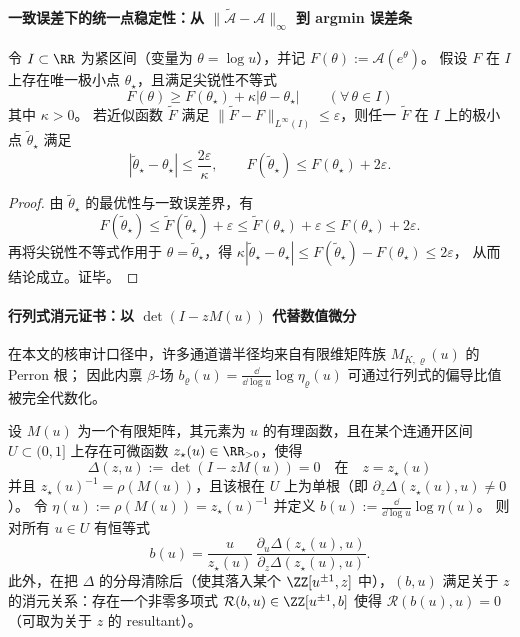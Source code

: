 \paragraph{一致误差下的统一点稳定性：从 \texorpdfstring{$\|\widetilde{\mathcal A}-\mathcal A\|_\infty$}{sup} 到 argmin 误差条}
\begin{theorem}[一致误差下的极小点稳定性]\label{thm:gut-argmin-stability}
令 \(I\subset\RR\) 为紧区间（变量为 \(\theta=\log u\)），并记 \(F(\theta):=\mathcal{A}(e^\theta)\)。
假设 \(F\) 在 \(I\) 上存在唯一极小点 \(\theta_\star\)，且满足尖锐性不等式
\[
F(\theta)\ge F(\theta_\star)+\kappa|\theta-\theta_\star|\qquad(\forall\,\theta\in I)
\]
其中 \(\kappa>0\)。
若近似函数 \(\widetilde F\) 满足 \(\|\widetilde F-F\|_{L^\infty(I)}\le \varepsilon\)，则任一 \(\widetilde F\) 在 \(I\) 上的极小点 \(\widetilde\theta_\star\) 满足
\[
|\widetilde\theta_\star-\theta_\star|\le \frac{2\varepsilon}{\kappa},
\qquad
F(\widetilde\theta_\star)\le F(\theta_\star)+2\varepsilon.
\]
\end{theorem}

\begin{proof}
由 \(\widetilde\theta_\star\) 的最优性与一致误差界，有
\[
F(\widetilde\theta_\star)\le \widetilde F(\widetilde\theta_\star)+\varepsilon
\le \widetilde F(\theta_\star)+\varepsilon
\le F(\theta_\star)+2\varepsilon.
\]
再将尖锐性不等式作用于 \(\theta=\widetilde\theta_\star\)，得
\(
\kappa|\widetilde\theta_\star-\theta_\star|\le F(\widetilde\theta_\star)-F(\theta_\star)\le 2\varepsilon
\)，
从而结论成立。证毕。
\end{proof}

\paragraph{行列式消元证书：以 \texorpdfstring{$\det(I-zM(u))$}{det} 代替数值微分}
在本文的核审计口径中，许多通道谱半径均来自有限维矩阵族 \(M_{K,\varrho}(u)\) 的 Perron 根；
因此内禀 \(\beta\)-场 \(b_\varrho(u)=\frac{\dd}{\dd\log u}\log\eta_\varrho(u)\) 可通过行列式的偏导比值被完全代数化。

\begin{proposition}[谱半径对数导数的偏导比值表示]\label{prop:gut-beta-determinant-ratio}
设 \(M(u)\) 为一个有限矩阵，其元素为 \(u\) 的有理函数，且在某个连通开区间 \(U\subset(0,1]\) 上存在可微函数 \(z_\star(u)\in\RR_{>0}\)，使得
\[
\Delta(z,u):=\det(I-zM(u))=0\quad\text{在}\quad z=z_\star(u)
\]
并且 \(z_\star(u)^{-1}=\rho(M(u))\)，且该根在 \(U\) 上为单根（即 \(\partial_z\Delta(z_\star(u),u)\neq 0\)）。
令 \(\eta(u):=\rho(M(u))=z_\star(u)^{-1}\) 并定义
\(
b(u):=\frac{\dd}{\dd\log u}\log\eta(u)
\)。
则对所有 \(u\in U\) 有恒等式
\[
b(u)=\frac{u}{z_\star(u)}\,
\frac{\partial_u\Delta(z_\star(u),u)}{\partial_z\Delta(z_\star(u),u)}.
\]
此外，在把 \(\Delta\) 的分母清除后（使其落入某个 \(\ZZ[u^{\pm1},z]\) 中），\((b,u)\) 满足关于 \(z\) 的消元关系：存在一个非零多项式
\(
\mathcal{R}(b,u)\in\ZZ[u^{\pm1},b]
\)
使得 \(\mathcal{R}(b(u),u)=0\)（可取为关于 \(z\) 的 resultant）。
\end{proposition}

